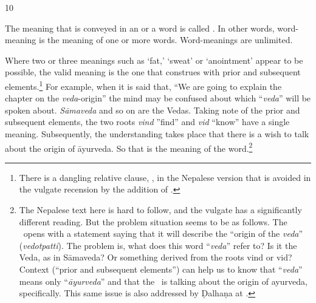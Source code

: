 \begin{translation}
\item [10] 

The meaning that is conveyed in an  or a word is 
called . In other words, word-meaning is the 
meaning of one or more words. Word-meanings are unlimited. 

Where two or three meanings such as `fat,’ `sweat’ or `anointment’ appear
to be possible, the valid meaning is the one that construes with prior
and subsequent elements.\footnote{There is a dangling relative clause,
    , in the Nepalese version that is avoided in the vulgate
    recension by the addition of .} For example, when it
    is said that, “We are going to explain the chapter on the
    \emph{veda}-origin” the mind may be confused about which “\emph{veda}”
    will be spoken about. \emph{Sāmaveda} and so on are the Vedas. Taking
    note of the prior and subsequent elements, the two roots \emph{vind}
    ”find” and \emph{vid} “know” have a single meaning. Subsequently, the
    understanding takes place that there is a wish to talk about the origin
    of āyurveda.  So that is the meaning of the word.\footnote{The Nepalese
        text here is hard to follow, and the vulgate has a significantly
        different reading. But the problem situation seems to be as follows.  The
        \SS\ opens with a statement saying that it will describe the “origin of
        the \emph{veda}” (\emph{vedotpatti}).  The problem is, what does this
        word “\emph{veda}” refer to?  Is it the Veda, as in Sāmaveda?  Or
        something derived from the roots \root vind or \root vid?  Context
        (“prior and subsequent elements”) can help us to know that “\emph{veda}”
        means only “\emph{āyurveda}” and that the \SS\ is talking about the
        origin of ayurveda, specifically.  This same issue is also addressed by 
        Ḍalhaṇa at .}


\end{translation}
